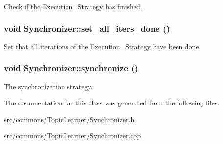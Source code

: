 Check if the \hyperlink{class_execution___strategy}{Execution\_\-Strategy} has finished. 

\hypertarget{class_synchronizer_a892a030d7fecf6a204721a75b43d8ca9}{
\subsubsection[{set\_\-all\_\-iters\_\-done}]{\setlength{\rightskip}{0pt plus 5cm}void Synchronizer::set\_\-all\_\-iters\_\-done ()}}
\label{class_synchronizer_a892a030d7fecf6a204721a75b43d8ca9}
Set that all iterations of the \hyperlink{class_execution___strategy}{Execution\_\-Strategy} have been done \hypertarget{class_synchronizer_aa633d250239482b3e11c958560308107}{
\subsubsection[{synchronize}]{\setlength{\rightskip}{0pt plus 5cm}void Synchronizer::synchronize ()}}
\label{class_synchronizer_aa633d250239482b3e11c958560308107}


The synchronization strategy. 



The documentation for this class was generated from the following files:\begin{DoxyCompactItemize}
\item 
src/commons/TopicLearner/\hyperlink{_synchronizer_8h}{Synchronizer.h}\item 
src/commons/TopicLearner/\hyperlink{_synchronizer_8cpp}{Synchronizer.cpp}\end{DoxyCompactItemize}
